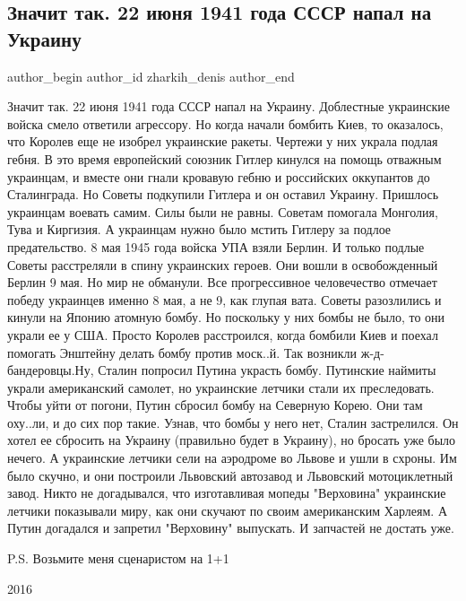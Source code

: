  
 
 
 
 
 
\subsection{Значит так. 22 июня 1941 года СССР напал на Украину}
\label{sec:22_10_2021.fb.zharkih_denis.1.istoria_v_kuchu}
 
\ifcmt
 author_begin
   author_id zharkih_denis
 author_end
\fi

Значит так. 22 июня 1941 года СССР напал на Украину. Доблестные украинские
войска смело ответили агрессору. Но когда начали бомбить Киев, то оказалось,
что Королев еще не изобрел украинские ракеты. Чертежи у них украла подлая
гебня. В это время европейский союзник Гитлер кинулся на помощь отважным
украинцам, и вместе они гнали кровавую гебню и российских оккупантов до
Сталинграда. Но Советы подкупили Гитлера и он оставил Украину. Пришлось
украинцам воевать самим. Силы были не равны. Советам помогала Монголия, Тува и
Киргизия. А украинцам нужно было мстить Гитлеру за подлое предательство. 8 мая
1945 года войска УПА взяли Берлин. И только подлые Советы расстреляли в спину
украинских героев. Они вошли в освобожденный Берлин 9 мая. Но мир не обманули.
Все прогрессивное человечество отмечает победу украинцев именно 8 мая, а не 9,
как глупая вата. Советы разозлились и кинули на Японию атомную бомбу. Но
поскольку у них бомбы не было, то они украли ее у США. Просто Королев
расстроился, когда бомбили Киев и поехал помогать Энштейну делать бомбу против
моск..й. Так возникли ж-д-бандеровцы.Ну, Сталин попросил Путина украсть бомбу.
Путинские наймиты украли американский самолет, но украинские летчики стали их
преследовать. Чтобы уйти от погони, Путин сбросил бомбу на Северную Корею. Они
там оху..ли, и до сих пор такие. Узнав, что бомбы у него нет, Сталин
застрелился. Он хотел ее сбросить на Украину (правильно будет в Украину), но
бросать уже было нечего. А украинские летчики сели на аэродроме во Львове и
ушли в схроны. Им было скучно, и они построили Львовский автозавод и Львовский
мотоциклетный завод.  Никто не догадывался, что изготавливая мопеды "Верховина"
украинские летчики показывали миру, как они скучают по своим американским
Харлеям. А Путин догадался и запретил "Верховину" выпускать. И запчастей не
достать уже. 

P.S. Возьмите меня сценаристом на 1+1

2016
